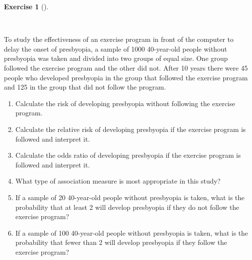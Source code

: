 \documentclass[
  a4paper,
]{scrreport}
\theoremstyle{definition}
\newtheorem{exercise}{Exercise}[chapter]
\theoremstyle{remark}
\begin{document}
\begin{exercise}[]\protect\hypertarget{exr-2}{}\label{exr-2}

~

To study the effectiveness of an exercise program in front of the
computer to delay the onset of presbyopia, a sample of 1000 40-year-old
people without presbyopia was taken and divided into two groups of equal
size. One group followed the exercise program and the other did not.
After 10 years there were 45 people who developed presbyopia in the
group that followed the exercise program and 125 in the group that did
not follow the program.

\begin{enumerate}
\def\labelenumi{\alph{enumi}.}
\item
  Calculate the risk of developing presbyopia without following the
  exercise program.
\item
  Calculate the relative risk of developing presbyopia if the exercise
  program is followed and interpret it.
\item
  Calculate the odds ratio of developing presbyopia if the exercise
  program is followed and interpret it.
\item
  What type of association measure is most appropriate in this study?
\item
  If a sample of 20 40-year-old people without presbyopia is taken, what
  is the probability that at least 2 will develop presbyopia if they do
  not follow the exercise program?
\item
  If a sample of 100 40-year-old people without presbyopia is taken,
  what is the probability that fewer than 2 will develop presbyopia if
  they follow the exercise program?
\end{enumerate}

\begin{tcolorbox}[enhanced jigsaw, colback=white, title=\textcolor{quarto-callout-tip-color}{\faLightbulb}\hspace{0.5em}{Solution}, arc=.35mm, colbacktitle=quarto-callout-tip-color!10!white, breakable, leftrule=.75mm, colframe=quarto-callout-tip-color-frame, opacitybacktitle=0.6, left=2mm, toptitle=1mm, bottomtitle=1mm, titlerule=0mm, rightrule=.15mm, bottomrule=.15mm, toprule=.15mm, opacityback=0, coltitle=black]


\end{tcolorbox}
\end{exercise}
\end{document}
